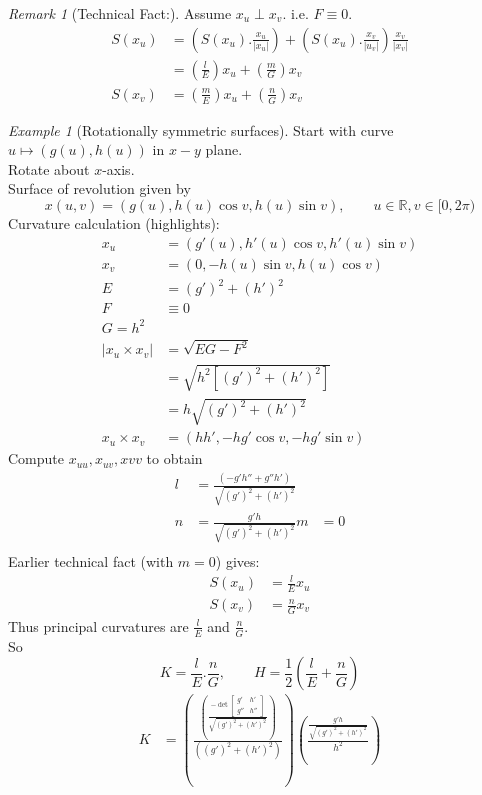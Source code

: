 \documentclass{article}
\newcommand{\R}{\mathbb{R}}
\newcommand{\abs}[1]{\left|#1\right|}
\theoremstyle{definition}
\theoremstyle{remark}
\theoremstyle{example}
\newtheorem*{remark}{Remark}
\newtheorem*{example}{Example}
\begin{document}
	\begin{remark}[Technical Fact:]
		Assume $x_u \perp x_v$. i.e. $F \equiv 0$.
		\begin{align*}
			S(x_u)&=\left(S(x_u).\frac{x_u}{\abs{x_u}}\right)+\left(S(x_u).\frac{x_v}{\abs{u_v}}\right)\frac{x_v}{\abs{x_v}}\\
			&= \left(\frac{l}{E}\right)x_u+\left(\frac{m}{G}\right)x_v\\
			S(x_v)&=\left(\frac{m}{E}\right)x_u+\left(\frac{n}{G}\right)x_v
		\end{align*}
	\end{remark}
	\begin{example}[Rotationally symmetric surfaces]
		Start with curve $u \mapsto (g(u),h(u))$ in $x-y$ plane.\\
		Rotate about $x$-axis.\\
		Surface of revolution given by \[x(u,v)=\left(g(u),h(u)\cos v, h(u)\sin v\right),\qquad u \in \R, v \in [0,2\pi)\]
		Curvature calculation (highlights):
		\begin{align*}
			x_u &= \left(g'(u),h'(u) \cos v, h'(u) \sin v\right)\\
			x_v &= \left(0,-h(u)\sin v, h(u) \cos v \right)\\
			E&=(g')^2+(h')^2\\
			F & \equiv 0\\
			G = h^2\\
			\abs{x_u \times x_v} &= \sqrt{EG-F^2}\\
			&= \sqrt{h^2[(g')^2+(h')^2]}\\
			&=h\sqrt{(g')^2+(h')^2}\\
			x_u \times x_v &= \left( hh',-hg'\cos v, -h g' \sin v \right)
		\end{align*}
		Compute $x_{uu},x_{uv},x{vv}$ to obtain \begin{align*}
			l&=\frac{\left(-g'h''+g''h'\right)}{\sqrt{(g')^2+(h')^2}}\\
			n&=\frac{g'h}{\sqrt{(g')^2+(h')^2}}
			m&=0\\
		\end{align*}
		Earlier technical fact (with $m=0$) gives:
		\begin{align*}
			S(x_u)&=\frac{l}{E}x_u\\
			S(x_v)&=\frac{n}{G}x_v
		\end{align*}
		Thus principal curvatures are $\frac{l}{E}$ and $\frac{n}{G}$.\\
		So \[K=\frac{l}{E}.\frac{n}{G},\qquad H=\frac{1}{2}\left(\frac{l}{E}+\frac{n}{G}\right) \]
		\begin{align*}
			K&=\left(\frac{\left(\frac{-\det \begin{bmatrix}
				g' & h'\\
				g'' & h''
			\end{bmatrix}}{\sqrt{(g')^2+(h')^2}}\right)}{((g')^2+(h')^2)}\right)
			\left(\frac{\frac{g'h}{\sqrt{(g')^2+(h')^2}}}{h^2}\right)
			\\
		\end{align*}
		
		
	\end{example}
\end{document}

